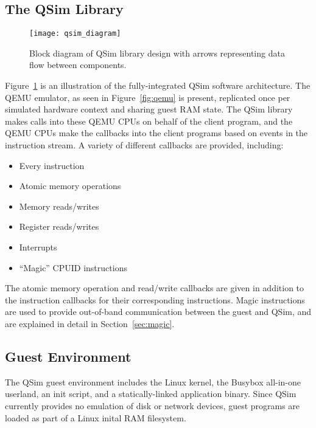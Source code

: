 \documentclass[letterpaper, 10pt]{book}
\begin{document}
\subsection{The QSim Library}

\begin{figure}
\begin{center}
\texttt{[image: qsim\_diagram]}
\caption{Block diagram of QSim library design with arrows representing data flow
         between components.}
\label{fig:qsim}
\end{center}
\end{figure}

Figure~\ref{fig:qsim} is an illustration of the fully-integrated QSim software
architecture. The QEMU emulator, as seen in Figure~\ref{fig:qemu} is present,
replicated once per simulated hardware context and sharing guest RAM state. The
QSim library makes calls into these QEMU CPUs on behalf of the client program,
and the QEMU CPUs make the callbacks into the client programs based on events in
the instruction stream. A variety of different callbacks are provided,
including:

\begin{itemize}
  \item{Every instruction}
  \item{Atomic memory operations}
  \item{Memory reads/writes}
  \item{Register reads/writes}
  \item{Interrupts}
  \item{``Magic'' CPUID instructions}
\end{itemize}

The atomic memory operation and read/write callbacks are given in addition to
the instruction callbacks for their corresponding instructions. Magic
instructions are used to provide out-of-band communication between the guest and
QSim, and are explained in detail in Section~\ref{sec:magic}.

\subsection{Guest Environment}

The QSim guest environment includes the Linux kernel, the Busybox all-in-one
userland, an init script, and a statically-linked application binary. Since QSim
currently provides no emulation of disk or network devices, guest programs are
loaded as part of a Linux inital RAM filesystem.
\end{document}
